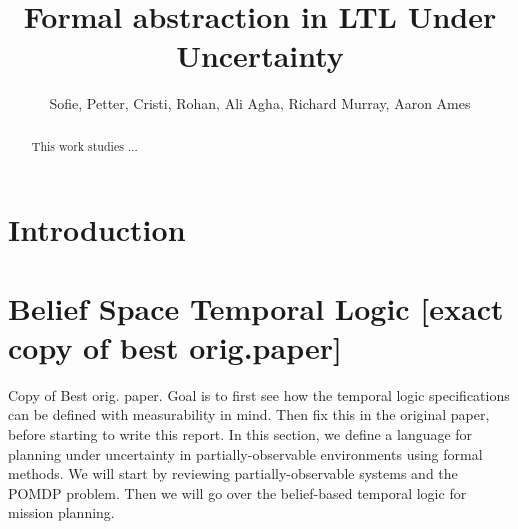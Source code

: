 \documentclass[conference]{IEEEtran}
\newcommand{\red}[1]{{\color{red} #1}}
\begin{document}

\title{\huge Formal abstraction in LTL Under Uncertainty}

\author{Sofie, Petter, Cristi, Rohan, Ali Agha, Richard Murray, Aaron Ames}

\maketitle

\begin{abstract}
This work studies ...
\end{abstract}

\IEEEpeerreviewmaketitle

	
\section{Introduction} \label{subsec:intro}


	\section{Belief Space Temporal Logic [exact copy of best orig.paper]}
	\red{Copy of Best orig. paper. Goal is to first see how the temporal logic specifications can be defined with measurability in mind. Then fix this in the original paper, before starting to write this report.}
	In this section, we define a language for planning under uncertainty in partially-observable environments using formal methods. We will start by reviewing partially-observable systems and the POMDP problem. Then we will go over the belief-based temporal logic for mission planning.
	
\end{document}
